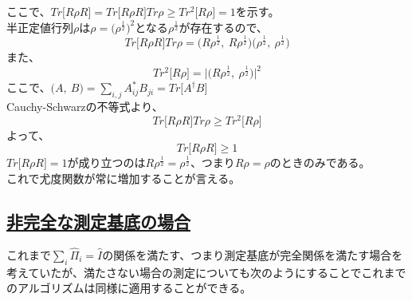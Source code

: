 \documentclass[11pt,a4j,notitlepage]{jreport}
\begin{document}
	ここで、$Tr \big[ R \rho R \big] = Tr \big[ R \rho R \big] Tr \rho \geq Tr^2 \big[ R \rho \big] = 1$を示す。\\
	半正定値行列$\rho$は$\rho = \big( \rho^{\frac{1}{2}} \big)^2$となる$\rho^{\frac{1}{2}}$が存在するので、
	\begin{equation}
		Tr \big[ R \rho R \big] Tr \rho = \Big( R \rho^{\frac{1}{2}},\ R \rho^{\frac{1}{2}} \Big) \Big( \rho^{\frac{1}{2}},\ \rho^{\frac{1}{2}} \Big)
	\end{equation}
	また、
	\begin{equation}
		Tr^2 \big[ R \rho \big] = \Big| \Big( R \rho^{\frac{1}{2}},\ \rho^{\frac{1}{2}} \Big) \Big|^2
	\end{equation}
	ここで、$\big( A,\ B \big) = \sum_{i,j} A^*_{ij} B_{ji} = Tr \big[ A^\dagger B \big]$\\
	Cauchy-Schwarzの不等式より、
	\begin{equation}
		Tr \big[ R \rho R \big] Tr \rho \geq Tr^2 \big[ R \rho \big]
	\end{equation}
	よって、
	\begin{equation}
		Tr \big[ R \rho R \big] \geq 1
	\end{equation}
	$Tr \big[ R \rho R \big] = 1$が成り立つのは$R \rho^{\frac{1}{2}} = \rho^{\frac{1}{2}}$、つまり$R \rho = \rho$のときのみである。\\

	これで尤度関数が常に増加することが言える。

	\subsection*{\underline{非完全な測定基底の場合}}

	これまで$\sum_i \hat{\Pi}_i = \hat{I}$の関係を満たす、つまり測定基底が完全関係を満たす場合を考えていたが、満たさない場合の測定についても次のようにすることでこれまでのアルゴリズムは同様に適用することができる。\\
\end{document}
